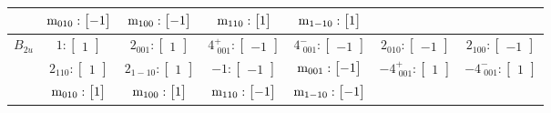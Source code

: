 \documentclass[fleqn,8pt,landscape]{jsarticle}
\begin{document}
\begin{longtable}{ccccccc}
& $ {\rm m}_{010}:\begin{bmatrix} -1 \end{bmatrix} $ & $ {\rm m}_{100}:\begin{bmatrix} -1 \end{bmatrix} $ & $ {\rm m}_{110}:\begin{bmatrix} 1 \end{bmatrix} $ & $ {\rm m}_{1-10}:\begin{bmatrix} 1 \end{bmatrix} $ & $  $ & $  $ \\ \hline
$ B_{2u} $ & $ 1:\begin{bmatrix} 1 \end{bmatrix} $ & $ 2{}_{001}:\begin{bmatrix} 1 \end{bmatrix} $ & $ 4^{+}_{\,\,001}:\begin{bmatrix} -1 \end{bmatrix} $ & $ 4^{-}_{\,\,001}:\begin{bmatrix} -1 \end{bmatrix} $ & $ 2{}_{010}:\begin{bmatrix} -1 \end{bmatrix} $ & $ 2{}_{100}:\begin{bmatrix} -1 \end{bmatrix} $ \\
& $ 2{}_{110}:\begin{bmatrix} 1 \end{bmatrix} $ & $ 2{}_{1-10}:\begin{bmatrix} 1 \end{bmatrix} $ & $ -1:\begin{bmatrix} -1 \end{bmatrix} $ & $ {\rm m}_{001}:\begin{bmatrix} -1 \end{bmatrix} $ & $ -4^{+}_{\,\,001}:\begin{bmatrix} 1 \end{bmatrix} $ & $ -4^{-}_{\,\,001}:\begin{bmatrix} 1 \end{bmatrix} $ \\
& $ {\rm m}_{010}:\begin{bmatrix} 1 \end{bmatrix} $ & $ {\rm m}_{100}:\begin{bmatrix} 1 \end{bmatrix} $ & $ {\rm m}_{110}:\begin{bmatrix} -1 \end{bmatrix} $ & $ {\rm m}_{1-10}:\begin{bmatrix} -1 \end{bmatrix} $ & $  $ & $  $ \\ \hline

\end{longtable}
\end{document}
